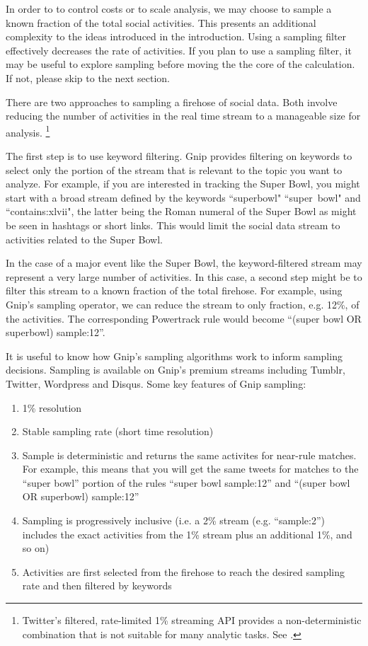 \documentclass{article}
\begin{document}
In order to to control costs or to scale analysis, we may choose to sample a known fraction of the total social activities. This presents an
additional complexity to the ideas introduced in the introduction. Using a sampling filter effectively decreases the rate of activities. If you
plan to use a sampling filter, it may be useful to explore sampling before moving the the core of the calculation.  
If not, please skip to the next section.

There are two approaches to sampling a firehose of social data. Both involve reducing the number of activities in the 
real time stream to a manageable size for analysis. \footnote{Twitter's filtered, rate-limited 1\% streaming API provides a 
non-deterministic combination that is not suitable for many analytic tasks.  See \cite{Morstatter:2013}.} 

The first step is to use keyword filtering.  Gnip provides filtering on keywords to select only the portion of the stream
that is relevant to the topic you want to analyze. For example, if you are interested in tracking the Super Bowl, you 
might start with a broad stream defined by the keywords ``superbowl" ``super~bowl" and ``contains:xlvii", the 
latter being the Roman numeral of the Super Bowl as might be seen in hashtags or short links. This would limit the 
social data stream to activities related to the Super Bowl.

In the case of a major event like the Super Bowl, the keyword-filtered stream may represent a very large number
of activities.  In this case, a second step might be to filter this stream to a known fraction of the total firehose. For 
example, using Gnip's sampling operator, we can reduce the stream to only fraction, e.g. 12\%, of the activities. 
The corresponding Powertrack rule would become  ``(super bowl OR superbowl) sample:12''.

It is useful to know how Gnip's sampling algorithms work to inform sampling decisions.  Sampling is available on
Gnip's premium streams including Tumblr, Twitter, Wordpress and Disqus. Some key features of Gnip sampling:

\begin{enumerate}
	\item 1\% resolution
	\item Stable sampling rate (short time resolution)
	\item Sample is deterministic and returns the same activites for near-rule matches.  For example, this means
	that you will get the same tweets for matches to the ``super bowl'' portion of the rules ``super bowl sample:12'' 
	and ``(super bowl OR superbowl) sample:12''
	\item Sampling is progressively inclusive (i.e. a 2\% stream (e.g. ``sample:2'') includes the exact activities from
	the 1\% stream plus an 
	additional 1\%,  and so on)
	\item Activities are first selected from the firehose to reach the desired sampling rate and then filtered by keywords 
\end{enumerate}
\end{document}
